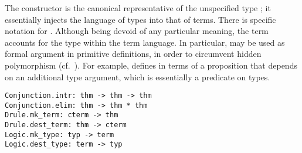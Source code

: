 \begin{isabellebody}
\begin{isamarkuptext}
  The  constructor is the canonical representative of
  the unspecified type ; it essentially injects the
  language of types into that of terms.  There is specific notation
   for .
  Although being devoid of any particular meaning, the term  accounts for the type  within the term
  language.  In particular,  may be used as formal
  argument in primitive definitions, in order to circumvent hidden
  polymorphism (cf.\ ).  For example,  defines  in terms of
  a proposition  that depends on an additional type
  argument, which is essentially a predicate on types.%
\end{isamarkuptext}%
\isamarkuptrue%
%
\isadelimmlref
%
\endisadelimmlref
%
\isatagmlref
%
\begin{isamarkuptext}%
\begin{mldecls}
  \verb|Conjunction.intr: thm -> thm -> thm| \\
  \verb|Conjunction.elim: thm -> thm * thm| \\
  \verb|Drule.mk_term: cterm -> thm| \\
  \verb|Drule.dest_term: thm -> cterm| \\
  \verb|Logic.mk_type: typ -> term| \\
  \verb|Logic.dest_type: term -> typ| \\
  \end{mldecls}


\end{isamarkuptext}
\end{isabellebody}
